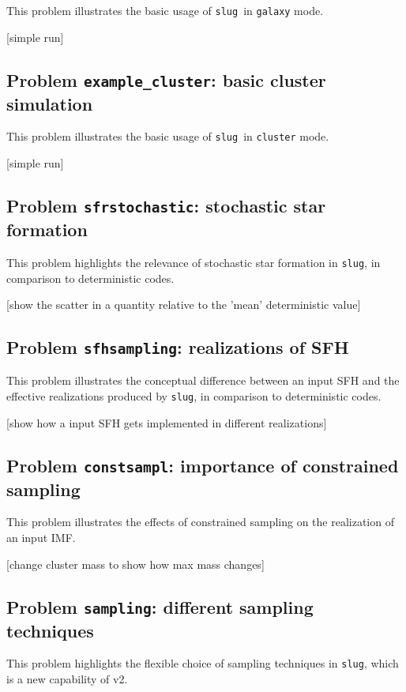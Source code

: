 \documentclass[12pt]{article}
\newcommand{\slug}{\texttt{slug}}
\begin{document}
This problem illustrates the basic usage of \slug\ in \verb=galaxy= mode. 

[simple run]

\subsection{Problem {\tt example\_cluster}: basic cluster simulation}

This problem illustrates the basic usage of \slug\ in \verb=cluster= mode. 

[simple run]

\subsection{Problem {\tt sfrstochastic}: stochastic star formation}

This problem highlights the relevance of stochastic star formation in \slug, in
comparison to deterministic codes.

[show the scatter in a quantity relative to the 'mean' deterministic value]

\subsection{Problem {\tt sfhsampling}: realizations of SFH}

This problem illustrates the conceptual difference between an input SFH and the effective 
realizations produced by \slug, in comparison to deterministic codes.

[show how a input SFH gets implemented in different realizations]

\subsection{Problem {\tt constsampl}: importance of constrained sampling}

This problem illustrates the effects of constrained sampling on the realization of an 
input IMF.

[change cluster mass to show how max mass changes]


\subsection{Problem {\tt sampling}: different sampling techniques}

This problem highlights the flexible choice of sampling techniques in \slug, which is 
a new capability of v2.
\end{document}
